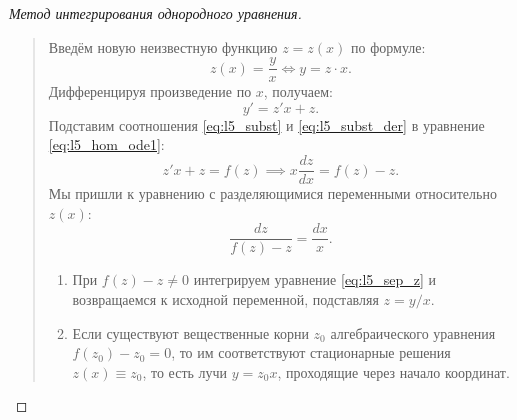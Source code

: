 \begin{proof}[Метод интегрирования однородного уравнения]~\\
    \begin{quote}
        Введём новую неизвестную функцию $z = z(x)$ по формуле:
        \begin{equation} \label{eq:l5_subst}
            z(x) = \frac{y}{x} \iff y = z \cdot x. \tag{4}
        \end{equation}
        Дифференцируя произведение по $x$, получаем:
        \begin{equation} \label{eq:l5_subst_der}
            y' = z' x + z. \tag{5}
        \end{equation}
        Подставим соотношения \eqref{eq:l5_subst} и \eqref{eq:l5_subst_der} в
        уравнение \eqref{eq:l5_hom_ode1}:
        \[
            z' x + z = f(z) \implies x \frac{dz}{dx} = f(z) - z.
        \]
        Мы пришли к уравнению с разделяющимися переменными относительно
        $z(x)$:
        \begin{equation} \label{eq:l5_sep_z}
            \frac{dz}{f(z) - z} = \frac{dx}{x}. \tag{6}
        \end{equation}
        \begin{enumerate}
            \item При $f(z) - z \neq 0$ интегрируем уравнение
            \eqref{eq:l5_sep_z} и возвращаемся к исходной переменной, подставляя
            $z = y/x$.
            \item Если существуют вещественные корни $z_0$ алгебраического
            уравнения $f(z_0) - z_0 = 0$, то им соответствуют стационарные
            решения $z(x) \equiv z_0$, то есть лучи $y = z_0 x$, проходящие
            через начало координат.
        \end{enumerate}
    \end{quote}
\end{proof}

